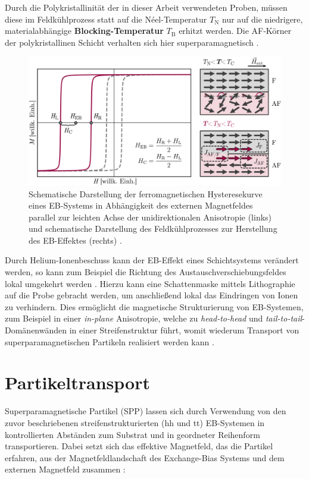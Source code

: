 \documentclass[page,pdftex,12pt,a4paper,twoside,openright]{scrbook}
\begin{document}
Durch die Polykristallinität der in dieser Arbeit verwendeten Proben, müssen diese im Feldkühlprozess statt auf die Néel-Temperatur \(T_\mathrm{N}\) nur auf die niedrigere, materialabhängige \textbf{Blocking-Temperatur} \(T_\mathrm{B}\) erhitzt werden. Die AF-Körner der polykristallinen Schicht verhalten sich hier superparamagnetisch \cite{ogrady_new_2010,bean_superparamagnetism_1959}.\\

\begin{figure}[!h]
\centering
\includegraphics[width=\textwidth]{img/eb.png}
\caption{\label{fig-eb}
Schematische Darstellung der ferromagnetischen Hysteresekurve eines EB-Systems in Abhängigkeit des externen Magnetfeldes parallel zur leichten Achse der unidirektionalen Anisotropie (links) und schematische Darstellung des Feldkühlprozesses zur Herstellung des EB-Effektes (rechts) \cite{merkel_einfluss_2018}.}
\end{figure}

Durch Helium-Ionenbeschuss kann der EB-Effekt eines Schichtsystems verändert werden, so kann zum Beispiel die Richtung des Austauschverschiebungsfeldes lokal umgekehrt werden \cite{mougin_local_2001}. Hierzu kann eine Schattenmaske mittels Lithographie auf die Probe gebracht werden, um anschließend lokal das Eindringen von Ionen zu verhindern. Dies ermöglicht die magnetische Strukturierung von EB-Systemen, zum Beispiel in einer \emph{in-plane} Anisotropie, welche zu \emph{head-to-head} und \emph{tail-to-tail}-Domänenwänden in einer Streifenstruktur führt, womit wiederum Transport von superparamagnetischen Partikeln realisiert werden kann \cite{holzinger_directed_2015}.\\

\section{Partikeltransport \label{sec-partikeltransport}}
\label{sec:orgddcac3d}
Superparamagnetische Partikel (SPP) lassen sich durch Verwendung von den zuvor beschriebenen streifenstrukturierten (hh und tt) EB-Systemen in kontrollierten Abständen zum Substrat und in geordneter Reihenform transportieren. Dabei setzt sich das effektive Magnetfeld, das die Partikel erfahren, aus der Magnetfeldlandschaft des Exchange-Bias Systems und dem externen Magnetfeld zusammen \cite{holzinger_directed_2015}:\\
\end{document}
